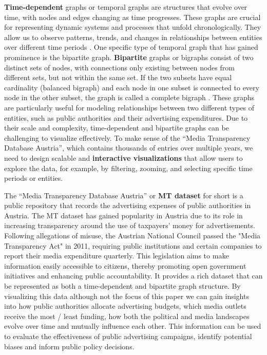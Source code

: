 \documentclass{vgtc}                          %
\begin{document}
\textbf{Time-dependent} graphs or temporal graphs are structures that evolve over time, with nodes and edges changing as time progresses. These graphs are crucial for representing dynamic systems and processes that unfold chronologically. They allow us to observe patterns, trends, and changes in relationships between entities over different time periods \cite{Waldner2020InteractiveEO}.
One specific type of temporal graph that has gained prominence is the bipartite graph. \textbf{Bipartite} graphs or bigraphs consist of two distinct sets of nodes, with connections only existing between nodes from different sets, but not within the same set. If the two subsets have equal cardinality (balanced bigraph) and each node in one subset is connected to every node in the other subset, the graph is called a complete bigraph \cite{diestel2012graph}. These graphs are particularly useful for modeling relationships between two different types of entities, such as public authorities and their advertising expenditures.
Due to their scale and complexity, time-dependent and bipartite graphs can be challenging to visualize effectively. To make sense of the ``Media Transparency Database Austria'', which contains thousands of entries over multiple years, we need to design scalable and \textbf{interactive visualizations} that allow users to explore the data, for example, by filtering, zooming, and selecting specific time periods or entities.

The ``Media Transparency Database Austria'' \cite{dataset} or \textbf{MT dataset} for short is a public repository that records the advertising expenses of public authorities in Austria. The MT dataset has gained popularity in Austria due to its role in increasing transparency around the use of taxpayers' money for advertisements. Following allegations of misuse, the Austrian National Council passed the "Media Transparency Act" in 2011, requiring public institutions and certain companies to report their media expenditure quarterly. This legislation aims to make information easily accessible to citizens, thereby promoting open government initiatives and enhancing public accountability.
It provides a rich dataset that can be represented as both a time-dependent and bipartite graph structure. By visualizing this data \textendash{} although not the focus of this paper \textendash{} we can gain insights into how public authorities allocate advertising budgets, which media outlets receive the most / least funding, how both the political and media landscapes evolve over time and mutually influence each other. This information can be used to evaluate the effectiveness of public advertising campaigns, identify potential biases and inform public policy decisions.
\end{document}

